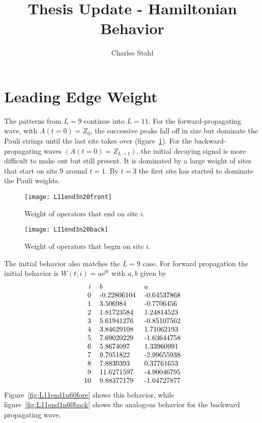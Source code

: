 \documentclass[11pt]{article}
\newcommand{\e}{\text{e}}
\begin{document}
\title{Thesis Update - Hamiltonian Behavior}
\author{Charles Stahl}

\maketitle

\section{Leading Edge Weight} \emph{}

The patterns from $L=9$ continue into $L=11$. For the forward-propagating wave, with $A(t=0)=Z_0$, the successive peaks fall off in size but dominate the Pauli strings until the last site takes over (figure~\ref{fig:L11end3n20front}). For the backward-propagating waves $(A(t=0)=Z_{L-1})$, the initial decaying signal is more difficult to make out but still present. It is dominated by a large weight of sites that start on site 9 around $t=1$. By $t = 3$ the first site has started to dominate the Pauli weights.

\begin{figure}
	\centering
	\texttt{[image: L11end3n20front]}
	\caption{Weight of operators that end on site $i$.}
	\label{fig:L11end3n20front}
\end{figure}
\begin{figure}
	\centering
	\texttt{[image: L11end3n20back]}
	\caption{Weight of operators that begin on site $i$.}
	\label{fig:L11end3n20back}
\end{figure}

The initial behavior also matches the $L=9$ case. For forward propagation the initial behavior is $W(t;i) = a\e^{bt}$ with $a,b$ given by
\begin{align*}
\begin{tabular}{rll}
$i$ & $b$ & $a$\\
0 &-0.22806104 &-0.64537868\\
1 & 3.506984  &-0.7706456\\
2 & 1.81723584  &1.24814523\\
3 & 5.61941276 &-0.85107562\\
4 & 3.84629108  &1.71062193\\
5 & 7.69020229 &-1.63644758\\
6 & 5.8674097   &1.33960991\\
7 & 9.7051822  &-2.99655938\\
8 & 7.8830393   &0.37761653\\
9 & 11.6271597   &-4.90046795\\
10 & 9.88377179 &-1.04727877
\end{tabular}
\end{align*}
Figure~\ref{fig:L11end1n60fore} shows this behavior, while figure~\ref{fig:L11end1n60back} shows the analogous behavior for the backward propagating wave. 
\end{document}
